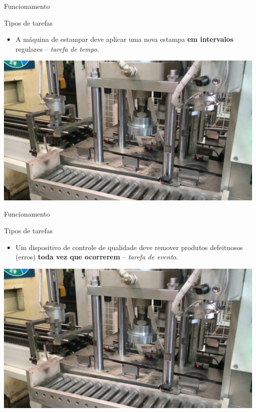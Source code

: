 \begin{frame}{Funcionamento}
	\begin{block}{Tipos de tarefas}
		\begin{itemize}
			\item A máquina de estampar deve aplicar uma nova estampa \textbf{em intervalos} regulares -- \textit{tarefa de tempo}.
		\end{itemize}
	\end{block}
	
	\centering
	
	\includegraphics[height=0.6\textheight]{Figuras/Ch09/fig3}
\end{frame}


\begin{frame}{Funcionamento}
	\begin{block}{Tipos de tarefas}
		\begin{itemize}
			\item Um dispositivo de controle de qualidade deve remover produtos defeituosos (erros) \textbf{toda vez que ocorrerem} -- \textit{tarefa de evento}.
		\end{itemize}
	\end{block}
	
	\centering
	
	\includegraphics[height=0.6\textheight]{Figuras/Ch09/fig3}
\end{frame}


